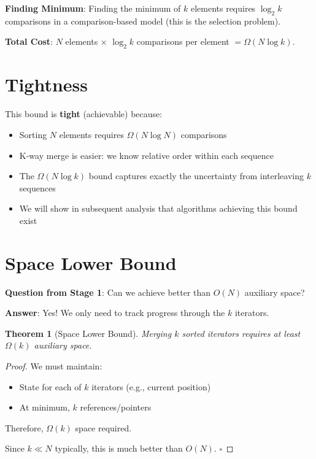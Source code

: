 \documentclass[11pt]{article}
\newtheorem{theorem}{Theorem}
\begin{document}
\textbf{Finding Minimum}: Finding the minimum of $k$ elements requires $\log_2 k$ comparisons in a comparison-based model (this is the selection problem).

\textbf{Total Cost}: $N$ elements $\times$ $\log_2 k$ comparisons per element $= \Omega(N \log k)$.

\section{Tightness}

This bound is \textbf{tight} (achievable) because:
\begin{itemize}
    \item Sorting $N$ elements requires $\Omega(N \log N)$ comparisons
    \item K-way merge is easier: we know relative order within each sequence
    \item The $\Omega(N \log k)$ bound captures exactly the uncertainty from interleaving $k$ sequences
    \item We will show in subsequent analysis that algorithms achieving this bound exist
\end{itemize}

\section{Space Lower Bound}

\textbf{Question from Stage 1}: Can we achieve better than $O(N)$ auxiliary space?

\textbf{Answer}: Yes! We only need to track progress through the $k$ iterators.

\begin{theorem}[Space Lower Bound]
Merging $k$ sorted iterators requires at least $\Omega(k)$ auxiliary space.
\end{theorem}

\begin{proof}
We must maintain:
\begin{itemize}
    \item State for each of $k$ iterators (e.g., current position)
    \item At minimum, $k$ references/pointers
\end{itemize}

Therefore, $\Omega(k)$ space required.

Since $k \ll N$ typically, this is much better than $O(N)$. $\square$
\end{proof}
\end{document}
